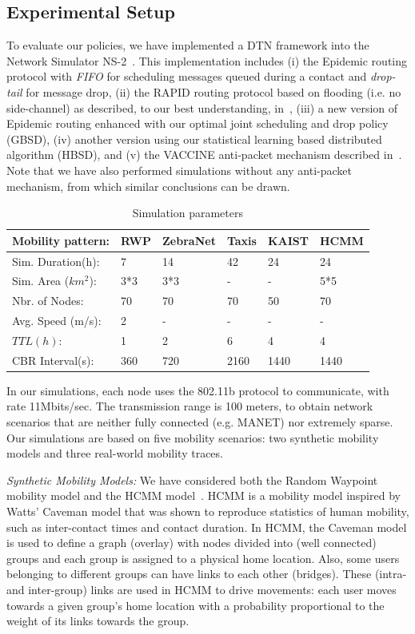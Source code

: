 \subsection{Experimental Setup}
\label{sec:ExperimentalSetup}

To evaluate our policies, we have implemented a DTN framework into the Network Simulator NS-2~\cite{DTN-NS2}. This implementation includes (i) the Epidemic routing protocol with \emph{FIFO} for scheduling messages queued during a contact and \emph{drop-tail} for message drop, (ii) the RAPID routing protocol based on flooding (i.e. no side-channel) as described, to our best
understanding, in~\cite{Levine:Sigcomm07}, (iii) a new version of Epidemic routing enhanced with our optimal joint scheduling and drop policy (GBSD), (iv) another version using our statistical learning based distributed algorithm (HBSD), and (v) the VACCINE anti-packet mechanism described in~\cite{Towsley:Epidemic}. Note that we have also performed simulations without any anti-packet mechanism, from which similar conclusions can be drawn.

\begin{table}[!h]
\renewcommand{\arraystretch}{1.1}
\caption{Simulation parameters}
\centering
\begin{tabular}{|p{4cm}|p{1.5cm}|p{1.5cm}|p{1.5cm}|p{1.5cm}|p{1.5cm}|}
\hline
\bfseries Mobility pattern: & RWP & ZebraNet & Taxis & KAIST& HCMM \\
\hline
Sim. Duration(h):& 7 & 14 & 42 & 24 & 24\\
\hline
Sim. Area ($km^2$):& 3*3 & 3*3 & - & - & 5*5\\
\hline
Nbr. of Nodes: & 70 & 70 & 70 & 50 & 70\\
\hline
Avg. Speed (m/s):& 2 & - & - & - & -\\
\hline
$TTL(h)$:& 1 & 2 & 6 & 4 & 4\\
\hline
CBR Interval(s):& 360 & 720 & 2160 & 1440& 1440\\
\hline
\end{tabular}
\label{SP}
\end{table}

In our simulations, each node uses the 802.11b protocol to communicate, with rate 11Mbits/sec. The transmission range is 100 meters, to obtain network scenarios that are neither fully connected (e.g. MANET) nor extremely sparse. Our simulations are based on five mobility scenarios: two synthetic mobility models and three real-world mobility traces.

\emph{Synthetic Mobility Models:} We have considered both the Random Waypoint mobility model and the HCMM model~\cite{HCMM}. HCMM is a mobility model inspired by Watts' Caveman model that was shown to reproduce statistics of human mobility, such as inter-contact times and contact duration. In HCMM, the Caveman model is used to define a graph (overlay) with nodes divided into (well connected) groups and each group is assigned to a physical home location. Also, some users belonging to different groups can have links to each other (bridges). These (intra- and inter-group) links are used in HCMM to drive movements: each user moves towards a given group's home location with a probability proportional to the weight of its links towards the group.

